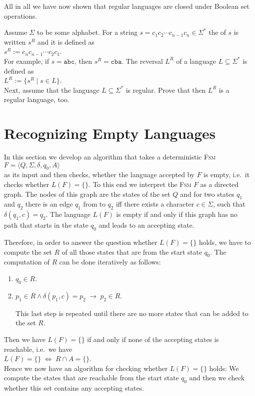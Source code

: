 All in all we have now shown that regular languages are closed under Boolean set operations.

\exerciseEng
Assume $\Sigma$ to be some alphabet.  For a string $s=c_1 c_2 \cdots c_{n-1} c_n \in \Sigma^*$ the
 
of $s$ is written $s^R$ and it is defined as
\\[0.2cm]
\hspace*{1.3cm}
$s^R := c_n c_{n-1} \cdots c_2 c_1$.
\\[0.2cm]
For example, if $s = \mathtt{abc}$, then $s^R = \mathtt{cba}$. The reversal $L^R$ of a language 
$L \subseteq \Sigma^*$ is defined as 
\\[0.2cm]
\hspace*{1.3cm}
$L^R := \{ s^R \mid s \in L \}$.
\\[0.2cm]
Next, assume that the language $L \subseteq \Sigma^*$ is regular.  Prove that then $L^R$ is a regular
language, too. \eox

\section{Recognizing Empty Languages \label{section:leer}}
In this section we develop an algorithm that takes a deterministic \textsc{Fsm}
\\[0.2cm]
\hspace*{1.3cm}
$F = \langle Q, \Sigma, \delta, q_0, A \rangle$
\\[0.2cm]
as its input and then checks, whether the language accepted by $F$ is empty, i.e.~it checks whether 
$L(F) = \{\}$.  To this end we interpret the \textsc{Fsm} $F$ as a directed graph.  The nodes of this graph are the
states of the set $Q$ and for two states $q_1$ and
$q_2$ there is an edge  $q_1$ from to $q_2$ iff there exists a character $c \in \Sigma$, such that $\delta(q_1,
c) = q_2$.  
The language $L(F)$ is empty if and only if this graph has no path that starts in the state
$q_0$ and leads to an accepting state.

Therefore, in order to answer the question whether $L(F) = \{\}$ holds, we have to compute the set $R$
of all those states that are  from the start state $q_0$.  The computation of $R$ can be done
iteratively as follows:
\begin{enumerate}
\item $q_0 \in R$.
\item $p_1 \in R \wedge \delta(p_1,c) = p_2 \;\rightarrow\; p_2 \in R$.

      This last step is repeated until there are no more states that can be added to the set $R$.
\end{enumerate}
Then we have $L(F) = \{\}$ if and only if none of the accepting states is reachable, i.e.~we have
\\[0.2cm]
\hspace*{1.3cm}
$L(F) = \{\} \;\Leftrightarrow\; R \cap A = \{\}$.
\\[0.2cm]
Hence we now have an algorithm for checking whether $L(F) = \{\}$ holds:
We compute the states that are reachable from the start state $q_0$ and then we check whether this set
contains any accepting states.


